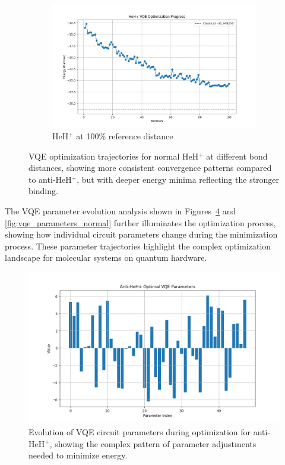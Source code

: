 \documentclass[10pt,twocolumn,a4paper]{article}
\begin{document}
\begin{figure}[t!]
\begin{subfigure}[b]{0.32\textwidth}
        \label{fig:vqe_progress_normal_50}
    \end{subfigure}
    \hfill
    \begin{subfigure}[b]{0.32\textwidth}
        \includegraphics[width=\textwidth]{graphs/vqe_progress_heh+_100.png}
        \caption{HeH$^+$ at 100\% reference distance}
        \label{fig:vqe_progress_normal_100}
    \end{subfigure}
    \caption{VQE optimization trajectories for normal HeH$^+$ at different bond distances, showing more consistent convergence patterns compared to anti-HeH$^+$, but with deeper energy minima reflecting the stronger binding.}
    \label{fig:vqe_progress_normal}
\end{figure}

The VQE parameter evolution analysis shown in Figures~\ref{fig:vqe_parameters_anti} and \ref{fig:vqe_parameters_normal} further illuminates the optimization process, showing how individual circuit parameters change during the minimization process. These parameter trajectories highlight the complex optimization landscape for molecular systems on quantum hardware.

\begin{figure}[t!]
    \centering
    \includegraphics[width=\columnwidth]{graphs/vqe_parameters_anti_heh+.png}
    \caption{Evolution of VQE circuit parameters during optimization for anti-HeH$^+$, showing the complex pattern of parameter adjustments needed to minimize energy.}
    \label{fig:vqe_parameters_anti}
\end{figure}
\end{document}
